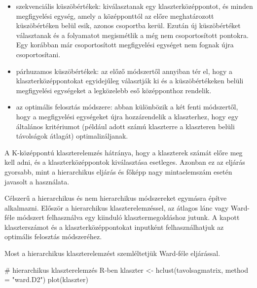 \documentclass[
  letterpaper,
]{krantz}
\makeatletter
\newenvironment{Shaded}{\begin{snugshade}}{\end{snugshade}}
\newcommand{\AttributeTok}[1]{\textcolor[rgb]{0.40,0.45,0.13}{#1}}
\newcommand{\CommentTok}[1]{\textcolor[rgb]{0.37,0.37,0.37}{#1}}
\newcommand{\FunctionTok}[1]{\textcolor[rgb]{0.28,0.35,0.67}{#1}}
\newcommand{\NormalTok}[1]{\textcolor[rgb]{0.00,0.23,0.31}{#1}}
\newcommand{\OtherTok}[1]{\textcolor[rgb]{0.00,0.23,0.31}{#1}}
\newcommand{\StringTok}[1]{\textcolor[rgb]{0.13,0.47,0.30}{#1}}
\providecommand{\tightlist}{%
  \setlength{\itemsep}{0pt}\setlength{\parskip}{0pt}}\usepackage{longtable,booktabs,array}
\newenvironment{kframe}{%
\medskip{}
\setlength{\fboxsep}{.8em}
 \def\at@end@of@kframe{}%
 \ifinner\ifhmode%
  \def\at@end@of@kframe{\end{minipage}}%
  \begin{minipage}{\columnwidth}%
 \fi\fi%
 \def\FrameCommand##1{\hskip\@totalleftmargin \hskip-\fboxsep
 \colorbox{shadecolor}{##1}\hskip-\fboxsep
     \hskip-\linewidth \hskip-\@totalleftmargin \hskip\columnwidth}%
 \MakeFramed {\advance\hsize-\width
   \@totalleftmargin\z@ \linewidth\hsize
   \@setminipage}}%
 {\par\unskip\endMakeFramed%
 \at@end@of@kframe}
\renewenvironment{Shaded}{\begin{kframe}}{\end{kframe}}
\makeatother
\begin{document}
\begin{itemize}
  \begin{itemize}
  \tightlist
  \item
    szekvenciális küszöbértékek: kiválasztanak egy klaszterközéppontot,
    és minden megfigyelési egység, amely a középponttól az előre
    meghatározott küszöbértéken belül esik, azonos csoportba kerül.
    Ezután új küszöbértéket választanak és a folyamatot megismétlik a
    még nem csoportosított pontokra. Egy korábban már csoportosított
    megfigyelési egységet nem fognak újra csoportosítani.
  \item
    párhuzamos küszöbértékek: az előző módszertől annyiban tér el, hogy
    a klaszterközéppontokat egyidejűleg választják ki és a
    küszöbértékeken belüli megfigyelési egységeket a legközelebb eső
    középponthoz rendelik.
  \item
    az optimális felosztás módszere: abban különbözik a két fenti
    módszertől, hogy a megfigyelési egységeket újra hozzárendelik a
    klaszterhez, hogy egy általános kritériumot (például adott számú
    klaszterre a klaszteren belüli távolságok átlagát) optimalizáljanak.
  \end{itemize}
\end{itemize}

A K-középpontú klaszterelemzés hátránya, hogy a klaszterek számát előre
meg kell adni, és a klaszterközéppontok kiválasztása esetleges. Azonban
ez az eljárás gyorsabb, mint a hierarchikus eljárás és főképp nagy
mintaelemszám esetén javasolt a használata.

Célszerű a hierarchikus és nem hierarchikus módszereket egymásra építve
alkalmazni. Először a hierarchikus klaszterelemzéssel, az átlagos lánc
vagy Ward-féle módszert felhasználva egy kiinduló klasztermegoldáshoz
jutunk. A kapott klaszterszámot és a klaszterközéppontokat inputként
felhasználhatjuk az optimális felosztás módszeréhez.

Most a hierarchikus klaszterelemzést szemléltetjük Ward-féle eljárással.

\begin{Shaded}
\begin{Highlighting}[]
\CommentTok{\# hierarchikus klaszterelemzés R{-}ben}
\NormalTok{klaszter }\OtherTok{\textless{}{-}} \FunctionTok{hclust}\NormalTok{(tavolsagmatrix, }\AttributeTok{method =} \StringTok{"ward.D2"}\NormalTok{)}
\FunctionTok{plot}\NormalTok{(klaszter)}
\end{Highlighting}
\end{Shaded}
\end{document}
